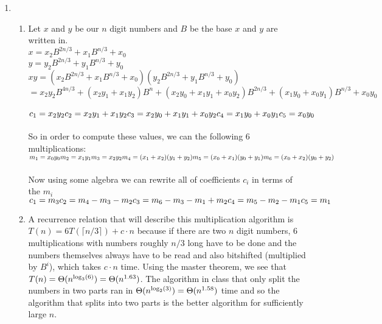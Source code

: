 \documentclass{article}
\begin{document}
\begin{enumerate}
	\item 
	\begin{enumerate}
		\item Let $x$ and $y$ be our $n$ digit numbers and $B$ be the base $x$ and $y$ are written in.  \\
		$x = x_2B^{2n/3}+x_1B^{n/3}+x_0$\\
		$y = y_2B^{2n/3}+y_1B^{n/3}+y_0$ \\
		$xy = (x_2B^{2n/3}+x_1B^{n/3}+x_0)(y_2B^{2n/3}+y_1B^{n/3}+y_0)$ \\
		$   = x_2y_2B^{4n/3}+(x_2y_1+x_1y_2)B^n + (x_2y_0+x_1y_1+x_0y_2)B^{2n/3}+(x_1y_0+x_0y_1)B^{n/3}+x_0y_0$ \\\\
		$c_1 = x_2y_2 \\ c_2 = x_2y_1+x_1y_2 \\ c_3 = x_2y_0+x_1y_1+x_0y_2 \\ c_4 = x_1y_0+x_0y_1 \\ c_5 = x_0y_0$ \\\\
		So in order to compute these values, we can the following 6 multiplications: \\
		$m_1 = x_0y_0\\ m_2 = x_1y_1 \\ m_3 = x_2y_2 \\
		 m_4 = (x_1 + x_2)(y_1 + y_2) \\ m_5 = (x_0 + x_1)(y_0 + y_1) \\ m_6 = (x_0 + x_2)(y_0 + y_2)$ \\\\
		Now using some algebra we can rewrite all of coefficients $c_i$ in terms of the $m_i$ \\
		$c_1 = m_3 \\ c_2 = m_4 - m_3 - m_2 \\ c_3 = m_6 - m_3 - m_1 + m_2\\ c_4 = m_5 - m_2 - m_1 \\ c_5 = m_1$ \\
		
		\item A recurrence relation that will describe this multiplication algorithm is $T(n) = 6T(\lceil n/3 \rceil) + c\cdot n$ because if there are two $n$ digit numbers, 6 multiplications with numbers roughly $n/3$ long have to be done and the numbers themselves always have to be read and also bitshifted (multiplied by $B^i$), which takes $c\cdot n$ time.  Using the master theorem, we see that $T(n) = \Theta(n^{\textup{log}_3(6)}) = \Theta(n^{1.63})$.  The algorithm in class that only split the numbers in two parts ran in $\Theta(n^{\textup{log}_2(3)}) = \Theta(n^{1.58})$ time and so the algorithm that splits into two parts is the better algorithm for sufficiently large $n$.  
		

\end{enumerate}
\end{enumerate}
\end{document}
